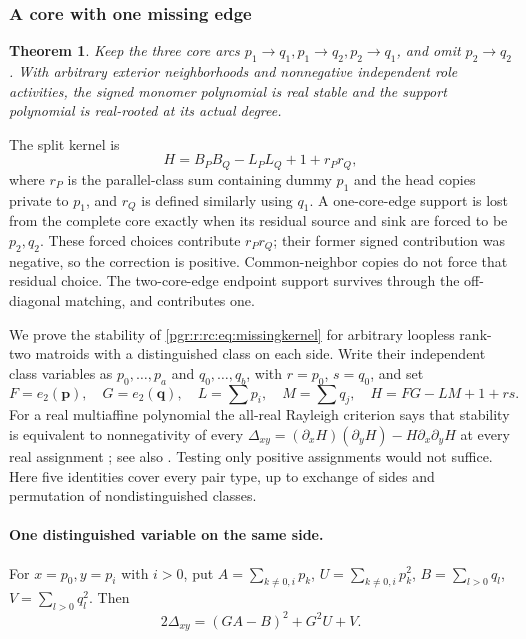 \documentclass[11pt]{article}
\numberwithin{equation}{section}
\newtheorem{theorem}{Theorem}[section]\newtheorem{lemma}[theorem]{Lemma}\newtheorem{proposition}[theorem]{Proposition}\newtheorem{corollary}[theorem]{Corollary}
\theoremstyle{definition}\newtheorem{definition}[theorem]{Definition}\newtheorem{remark}[theorem]{Remark}
\begin{document}
\subsubsection{A core with one missing edge}
\begin{theorem}\label{pgr:r:rc:thm:missing}
Keep the three core arcs $p_1\to q_1,p_1\to q_2,p_2\to q_1$, and omit $p_2\to q_2$. With arbitrary exterior neighborhoods and nonnegative independent role activities, the signed monomer polynomial is real stable and the support polynomial is real-rooted at its actual degree.
\end{theorem}
The split kernel is
\begin{equation}\label{pgr:r:rc:eq:missingkernel}
 H=B_PB_Q-L_PL_Q+1+r_Pr_Q,
\end{equation}
where $r_P$ is the parallel-class sum containing dummy $p_1$ and the head copies private to $p_1$, and $r_Q$ is defined similarly using $q_1$. A one-core-edge support is lost from the complete core exactly when its residual source and sink are forced to be $p_2,q_2$. These forced choices contribute $r_Pr_Q$; their former signed contribution was negative, so the correction is positive. Common-neighbor copies do not force that residual choice. The two-core-edge endpoint support survives through the off-diagonal matching, and contributes one.

We prove the stability of \eqref{pgr:r:rc:eq:missingkernel} for arbitrary loopless rank-two matroids with a distinguished class on each side. Write their independent class variables as $p_0,\ldots,p_a$ and $q_0,\ldots,q_b$, with $r=p_0$, $s=q_0$, and set
\[
 F=e_2(\mathbf p),\quad G=e_2(\mathbf q),\quad
 L=\sum p_i,\quad M=\sum q_j,\quad H=FG-LM+1+rs.
\]
For a real multiaffine polynomial the all-real Rayleigh criterion says that stability is equivalent to nonnegativity of every
$\Delta_{xy}=(\partial_xH)(\partial_yH)-H\partial_x\partial_yH$
at every real assignment \cite[Theorem 5.6]{BrandenHPP}; see also \cite[Theorem 3.1]{WagnerSurvey}. Testing only positive assignments would not suffice. Here five identities cover every pair type, up to exchange of sides and permutation of nondistinguished classes.

\paragraph{One distinguished variable on the same side.}
For $x=p_0,y=p_i$ with $i>0$, put
$A=\sum_{k\ne0,i}p_k$, $U=\sum_{k\ne0,i}p_k^2$,
$B=\sum_{l>0}q_l$, $V=\sum_{l>0}q_l^2$. Then
\[
 2\Delta_{xy}=(GA-B)^2+G^2U+V.
\]
\end{document}
